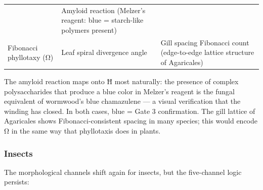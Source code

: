 \begin{longtable}[]{@{}lll@{}}
\begin{minipage}[t]{0.30\columnwidth}
\end{minipage} & \begin{minipage}[t]{0.30\columnwidth}\raggedright
Amyloid reaction (Melzer's reagent: blue = starch-like polymers
present)\strut
\end{minipage}\tabularnewline
\begin{minipage}[t]{0.30\columnwidth}\raggedright
Fibonacci phyllotaxy (Ω)\strut
\end{minipage} & \begin{minipage}[t]{0.30\columnwidth}\raggedright
Leaf spiral divergence angle\strut
\end{minipage} & \begin{minipage}[t]{0.30\columnwidth}\raggedright
Gill spacing Fibonacci count (edge-to-edge lattice structure of
Agaricales)\strut
\end{minipage}\tabularnewline
\bottomrule
\end{longtable}

The amyloid reaction maps onto Ħ most naturally: the presence of complex
polysaccharides that produce a blue color in Melzer's reagent is the
fungal equivalent of wormwood's blue chamazulene --- a visual
verification that the winding has closed. In both cases, blue = Gate 3
confirmation. The gill lattice of Agaricales shows Fibonacci-consistent
spacing in many species; this would encode Ω in the same way that
phyllotaxis does in plants.

\hypertarget{insects}{%
\subsubsection{Insects}\label{insects}}

The morphological channels shift again for insects, but the five-channel
logic persists:

